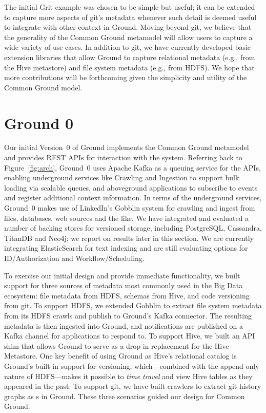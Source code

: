 \documentclass{cidr-2017}
\begin{document}
The initial Grit example was chosen to be simple but useful; it can be extended to capture more aspects of git's metadata whenever such detail is deemed useful to integrate with other context in Ground. Moving beyond git, we believe that the generality of the Common Ground metamodel will allow users to capture a wide variety of use cases. In addition to git, we have currently developed basic extension libraries that allow Ground to capture relational metadata (e.g., from the Hive metastore) and file system metadata (e.g., from HDFS). We hope that more contributions will be forthcoming given the simplicity and utility of the Common Ground model.

\section{Ground 0}
\label{sec:prototype}

Our initial Version~0 of Ground implements the Common Ground metamodel and provides REST APIs for interaction with the system. 
Referring back to Figure~\ref{fig:arch}, Ground~0 uses Apache Kafka as a queuing service for the APIs, enabling underground services like Crawling and Ingestion to support bulk loading via scalable queues, and aboveground applications to subscribe to events and register additional context information. In terms of the underground services, Ground~0 makes use of LinkedIn's Gobblin system for crawling and ingest from files, databases, web sources and the like.
We have integrated and evaluated a number of backing stores for versioned storage, including PostgreSQL, Cassandra, TitanDB and Neo4j; we report on results later in this section.
We are currently integrating ElasticSearch for text indexing and are still evaluating options for ID/Authorization and Workflow/Scheduling. 

To exercise our initial design and provide immediate functionality,
we built support for three sources of metadata most commonly used in the Big Data ecosystem: file metadata from HDFS, schemas from Hive, and code versioning from git.
To support HDFS, we extended Gobblin to extract file system metadata from its HDFS crawls and publish to Ground's Kafka connector. The resulting metadata is then ingested into Ground, and notifications are published on a Kafka channel for applications to respond to. To support Hive, we built an API shim that allows Ground to serve as a drop-in replacement for the Hive Metastore.
One key benefit of using Ground as Hive's relational catalog is Ground's built-in support for versioning, which---combined with the append-only nature of HDFS---makes it possible to \emph{time travel} and view Hive tables as they appeared in the past.  To support git, we have built crawlers to extract git history graphs as s in Ground. These three scenarios guided our design for Common Ground.
\end{document}
